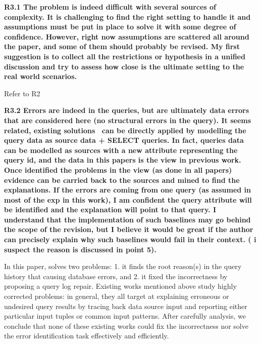 \noindent \textbf{R3.1 The problem is indeed difficult with several sources of complexity. It is challenging to find the right setting to handle it and assumptions must be put in place to solve it with some degree of confidence. However, right now assumptions are scattered all around the paper, and some of them should probably be revised.
My first suggestion is to collect all the restrictions or hypothesis in a unified discussion and try to assess how close is the ultimate setting to the real world scenarios.} 

{Refer to R2}

\noindent \textbf{R3.2 Errors are indeed in the queries, but are ultimately data errors that are considered here (no structural errors in the query). It seems related, existing solutions~\cite{Wu13, roy2014formal, chalamalla2014,meliou2011tracing} can be directly applied by modelling the query data as source data + SELECT queries. In fact, queries data can be modelled as sources with a new attribute representing the query id, and the data in this papers is the view in previous work. Once identified the problems in the view (as done in all papers) evidence can be carried back to the sources and mined to find the explanations. If the errors are coming from one query (as assumed in most of the exp in this work), I am confident the query attribute will be identified and the explanation will point to that query. I understand that the implementation of such baselines may go behind the scope of the revision, but I believe it would be great if the author can precisely explain why such baselines would fail in their context. ( i suspect the reason is discussed in point 5). }

In this paper, \sys solves two problems: 1. it finds the root reason(s) in the query history that causing database errors, and 2. it fixed the incorrectness by proposing a query log repair. Existing works mentioned above study highly corrected problems: in general, they all target at explaining erroneous or undesired query results by tracing back data source input and reporting either particular input tuples or common input patterns. After carefully analysis, we conclude that none of these existing works could fix the incorrectness nor solve the error identification task effectively and efficiently. 

